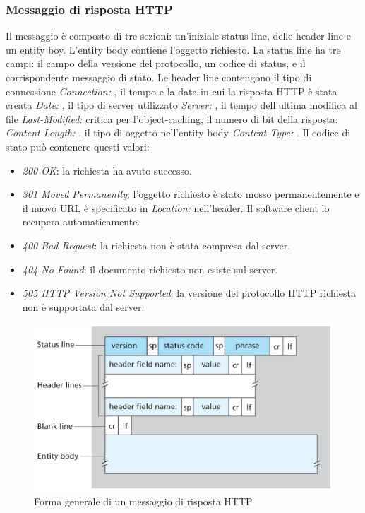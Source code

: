 \subsubsection{Messaggio di risposta HTTP}
Il messaggio \`e composto di tre sezioni: un'iniziale status line, delle header line e un entity boy. L'entity body contiene l'oggetto richiesto. La status line ha tre campi: il campo della versione del protocollo, un
codice di status, e il corrispondente messaggio di stato.  Le header line contengono il tipo di connessione \emph{Connection: }, il tempo e la data in cui la risposta HTTP \`e stata creata \emph{Date: }, il tipo di 
server utilizzato \emph{Server: }, il tempo dell'ultima modifica al file \emph{Last-Modified: } critica per l'object-caching, il numero di bit della risposta: \emph{Content-Length: }, il tipo di oggetto nell'entity 
body \emph{Content-Type: }. Il codice di stato pu\`o contenere questi valori:
\begin{itemize}
\item \emph{200 OK}: la richiesta ha avuto successo.
\item \emph{301 Moved Permanently}: l'oggetto richiesto \`e stato mosso permanentemente e il nuovo URL \`e specificato in \emph{Location: } nell'header. Il software client lo recupera automaticamente.
\item \emph{400 Bad Request}: la richiesta non \`e stata compresa dal server.
\item \emph{404 No Found}: il documento richiesto non esiste sul server.
\item \emph{505 HTTP Version Not Supported}: la versione del protocollo HTTP richiesta non \`e supportata dal server.
\end{itemize}
\begin{figure}
\includegraphics[width=\textwidth]{Pictures/HTTPResponseMessage.png}
\caption{Forma generale di un messaggio di risposta HTTP}
\end{figure}
